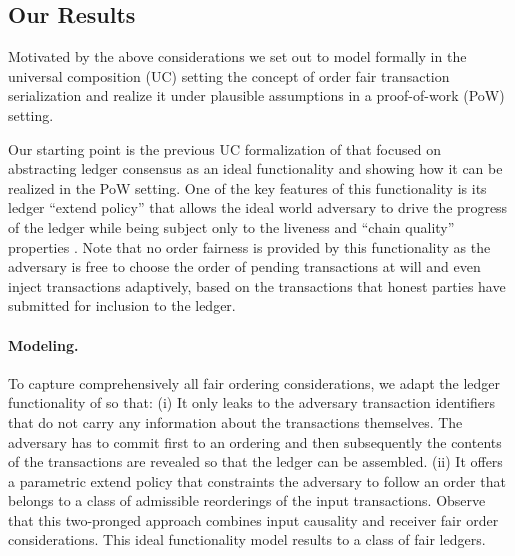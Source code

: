 \subsection{Our Results}
\label{subsec:our-results}

Motivated by the above considerations we set out to model formally in the universal composition (UC) setting \cite{FOCS:Canetti01} the concept of order fair transaction serialization and realize it under plausible assumptions in a proof-of-work (PoW) setting.

Our starting point is the previous UC formalization of \cite{C:BMTZ17} that focused on abstracting ledger consensus as an ideal functionality and showing how it can be realized in the PoW setting.
%
One of the key features of this functionality is its ledger ``extend policy'' that allows the ideal world adversary to drive the progress of the ledger while being subject only to the liveness and ``chain quality'' properties \cite{EC:GarKiaLeo15}.
%
Note that no order fairness is provided by this functionality as the adversary is free to choose the order of pending transactions at will and even inject transactions adaptively, based on the transactions that honest parties have submitted for inclusion to the ledger.

\paragraph{Modeling.}
%
To capture comprehensively all fair ordering considerations, we adapt the ledger functionality of \cite{C:BMTZ17} so that:
%
(i) It only leaks to the adversary transaction identifiers that do not carry any information about the transactions themselves.
%
The adversary has to commit first to an ordering and then subsequently the contents of the transactions are revealed so that the ledger can be assembled.
%
(ii) It offers a parametric extend policy that constraints the adversary to follow an order that belongs to a class of admissible reorderings of the input transactions.
%
Observe that this two-pronged approach combines input causality and receiver fair order considerations.
%
This ideal functionality model results to a class of fair ledgers.

